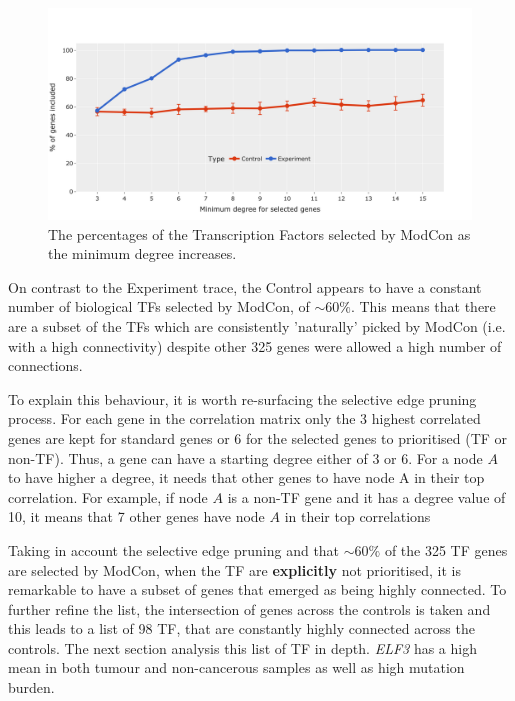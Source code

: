 \begin{figure}[!ht]   
\centering
\includegraphics[width=1.0\textwidth,height=1.0\textheight,keepaspectratio]{Sections/Network_I/Resources/selective_pruning/ctrls_min_dig_mev.png}
  \caption{The percentages of the Transcription Factors selected by ModCon as the minimum degree increases.}
\label{fig:N_I:sel_tfs}
\end{figure}

On contrast to the Experiment trace, the Control appears to have a constant number of biological TFs selected by ModCon, of $\sim60\%$. This means that there are a subset of the TFs which are consistently 'naturally' picked by ModCon (i.e. with a high connectivity) despite other 325 genes were allowed a high number of connections. 

To explain this behaviour, it is worth re-surfacing the selective edge pruning process. For each gene in the correlation matrix only the 3 highest correlated genes are kept for standard genes or 6 for the selected genes to prioritised (TF or non-TF). Thus, a gene can have a starting degree either of 3 or 6. For a node $A$ to have higher a degree, it needs that other genes to have node A in their top correlation. For example, if node $A$ is a non-TF gene and it has a degree value of 10, it means that 7 other genes have node $A$ in their top correlations

Taking in account the selective edge pruning and that $\sim60\%$ of the 325 TF genes are selected by ModCon, when the TF are \textbf{explicitly} not prioritised, it is remarkable to have a subset of genes that emerged as being highly connected. To further refine the list, the intersection of genes across the controls is taken and this leads to a list of 98 TF, that are constantly highly connected across the controls. The next section analysis this list of TF in depth. \textit{ELF3} has a high mean in both tumour and non-cancerous samples as well as high mutation burden.


